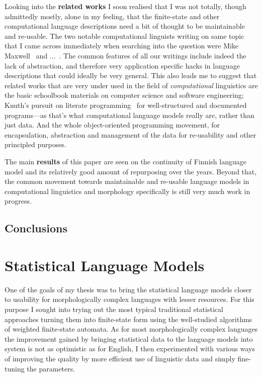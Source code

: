 \documentclass[officiallayout,draft]{unihelcompling}
\begin{document}
Looking into the \textbf{related works} I soon realised that I was not totally,
though admittedly mostly, alone in my feeling, that the finite-state and other
computational language descriptions need a bit of thought to be maintainable
and re-usable. The two notable computational linguists writing on same topic
that I came across immediately when searching into the question were Mike
Maxwell~\cite{maxwell} and ...~\cite{wintner2008strengths}. The common features
of all our writings include indeed the lack of abstraction, and therefore very
application specific hacks in language descriptions that could ideally be very
general. This also leads me to suggest that related works that are very under
used in the field of \emph{computational} linguistics are the basic schoolbook
materials on computer science and software engineering; Knuth's pursuit on
literate programming~\cite{knuth1992literate} for well-structured and
documented programs---as that's what computational language models really are,
rather than just data. And the whole object-oriented programming movement, for
encapsulation, abstraction and management of the data for re-usability and
other principled purposes.

The main \textbf{results} of this paper are seen on the continuity of Finnish
language model and its relatively good amount of repurposing over the years.
Beyond that, the common movement towards maintainable and re-usable language
models in computational linguistics and morphology specifically is still very
much work in progress.

\section{Conclusions}



\chapter{Statistical Language Models}
\label{chap:statistical-models}

One of the goals of my thesis was to bring the statistical language models
closer to usability for morphologically complex languages with lesser
resources. For this purpose I sought into trying out the most typical
traditional statistical approaches turning them into finite-state form
using the well-studied algorithms of weighted finite-state automata. As for
most morphologically complex languages the improvement gained by bringing
statistical data to the language models into system is not as optimistic as
for English, I then experimented with various ways of improving the quality
by more efficient use of linguistic data and simply fine-tuning the parameters.
\end{document}

